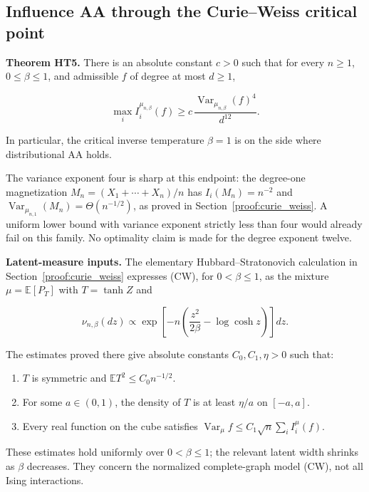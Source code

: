 \subsection{Influence AA through the Curie--Weiss critical point}\label{ht:full-aa-through-the-curieweiss-critical-point}

\textbf{Theorem HT5.} There is an absolute constant \(c>0\) such that for every \(n\ge 1\), \(0\le \beta\le 1\), and admissible \(f\) of degree at most \(d\ge 1\),

\[
\boxed{\qquad
\max_i I_i^{\mu_{n,\beta}}(f)
\ge c\,\frac{\operatorname{Var}_{\mu_{n,\beta}}(f)^4}{d^{12}}.
\qquad}
\tag{HT5}
\]

In particular, the critical inverse temperature \(\beta=1\) is on the side where distributional AA holds.

The variance exponent four is sharp at this endpoint: the degree-one magnetization \(M_n=(X_1+\cdots +X_n)/n\) has \(I_i(M_n)=n^{-2}\) and \(\operatorname{Var}_{\mu_{n,1}}(M_n)=\Theta(n^{-1/2})\), as proved in Section~\ref{proof:curie_weiss}. A uniform lower bound with variance exponent strictly less than four would already fail on this family. No optimality claim is made for the degree exponent twelve.

\textbf{Latent-measure inputs.} The elementary Hubbard--Stratonovich calculation in Section~\ref{proof:curie_weiss} expresses (CW), for \(0<\beta\le 1\), as the mixture \(\mu=\mathbb E[P_T]\) with \(T=\tanh Z\) and

\[
\nu_{n,\beta}(dz)
\propto \exp\left[-n\left(\frac{z^2}{2\beta}-\log\cosh z\right)\right]dz.
\]

The estimates proved there give absolute constants \(C_0,C_1,\eta>0\) such that:

\begin{enumerate}
\def\labelenumi{\arabic{enumi}.}
\tightlist
\item
  \(T\) is symmetric and \(\mathbb E T^2\le C_0 n^{-1/2}\).
\item
  For some \(a \in (0,1)\), the density of \(T\) is at least \(\eta/a\) on \([-a,a]\).
\item
  Every real function on the cube satisfies \(\operatorname{Var}_\mu f \le  C_1 \sqrt{n} \sum_i I_i^\mu(f)\).
\end{enumerate}

These estimates hold uniformly over \(0<\beta\le 1\); the relevant latent width shrinks as \(\beta\) decreases. They concern the normalized complete-graph model (CW), not all Ising interactions.

